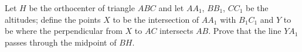 Let $H$ be the orthocenter of triangle $ABC$ and let $AA_1$, $BB_1$, $CC_1$ be the altitudes;
define the points $X$ to be the intersection of $AA_1$ with $B_1C_1$ and $Y$ to be where
the perpendicular from $X$ to $AC$ intersects $AB$. Prove that the line $YA_1$ passes
through the midpoint of $BH$.
